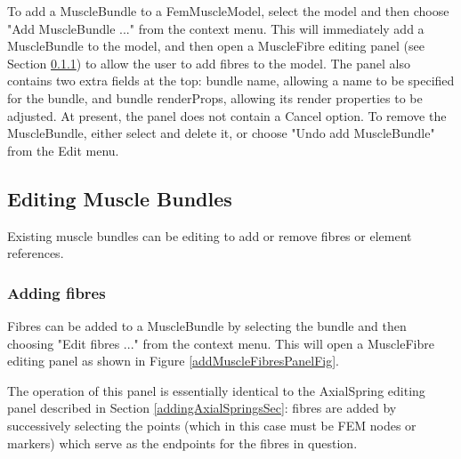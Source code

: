 \documentclass{article}
\begin{document}
To add a MuscleBundle to a FemMuscleModel, select the model and then
choose {\sf "Add MuscleBundle ..."} from the context menu.  This will
immediately add a MuscleBundle to the model, and then open a
MuscleFibre editing panel (see Section \ref{addingFibresSec}) to allow the user to
add fibres to the model. The panel also contains two extra fields at
the top: {\sf bundle name}, allowing a name to be specified for the
bundle, and {\sf bundle renderProps}, allowing its render properties to be
adjusted. At present, the panel does not contain a {\sf Cancel} option. To
remove the MuscleBundle, either select and delete it, or choose {\sf "Undo
add MuscleBundle"} from the {\sf Edit} menu.

\subsection{Editing Muscle Bundles}

Existing muscle bundles can be editing to add or remove fibres or
element references.

\subsubsection{Adding fibres}
\label{addingFibresSec}

Fibres can be added to a MuscleBundle by selecting the bundle and then
choosing {\sf "Edit fibres ..."} from the context menu. This will open
a MuscleFibre editing panel as shown in Figure \ref{addMuscleFibresPanelFig}.

The operation of this panel is essentially identical to
the AxialSpring editing panel described in Section \ref{addingAxialSpringsSec}:
fibres are added by successively selecting the points
(which in this case must be FEM nodes or markers)
which serve as the endpoints for the fibres in question.
\end{document}
